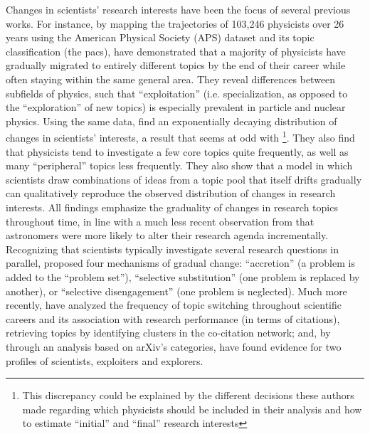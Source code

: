 \documentclass{article}
\begin{document}
Changes in scientists' research interests have been the focus of several previous works. For instance, by mapping the trajectories of 103,246 physicists over 26 years using the American Physical Society (APS) dataset and its topic classification (the \gls{pacs}), \citet{Aleta2019} have demonstrated that a majority of physicists have gradually migrated to entirely different topics by the end of their career while often staying within the same general area. They reveal differences between subfields of physics, such that ``exploitation'' (i.e. specialization, as opposed to the ``exploration'' of new topics) is especially prevalent in particle and nuclear physics.  Using the same data, \citet{Jia2017} find an exponentially decaying distribution of changes in scientists' interests, a result that seems at odd with \citealt{Aleta2019}\footnote{This discrepancy could be explained by the different decisions these authors made regarding which physicists should be included in their analysis and how to estimate ``initial'' and ``final'' research interests}. They also find that physicists tend to investigate a few core topics quite frequently, as well as many ``peripheral'' topics less frequently. %
They also show that a model in which scientists draw combinations of ideas from a topic pool that itself drifts gradually can qualitatively reproduce the observed distribution of changes in research interests. All findings emphasize the graduality of changes in research topics throughout time, in line with a much less recent observation from \citet{Gieryn1978} that astronomers were more likely to alter their research agenda incrementally. Recognizing that scientists typically investigate several research questions in parallel, \citeauthor{Gieryn1978} proposed four mechanisms of gradual change: ``accretion'' (a problem is added to the ``problem set''),  ``selective substitution'' (one problem is replaced by another), or ``selective disengagement'' (one problem is neglected). Much more recently, \citet{Zeng2019} have analyzed the frequency of topic switching throughout scientific careers and its association with research performance (in terms of citations), retrieving topics by identifying clusters in the co-citation network; and,  by through an analysis based on arXiv's categories, \citet{Chakresh2023} have found evidence for two profiles of scientists, exploiters and explorers.
\end{document}
